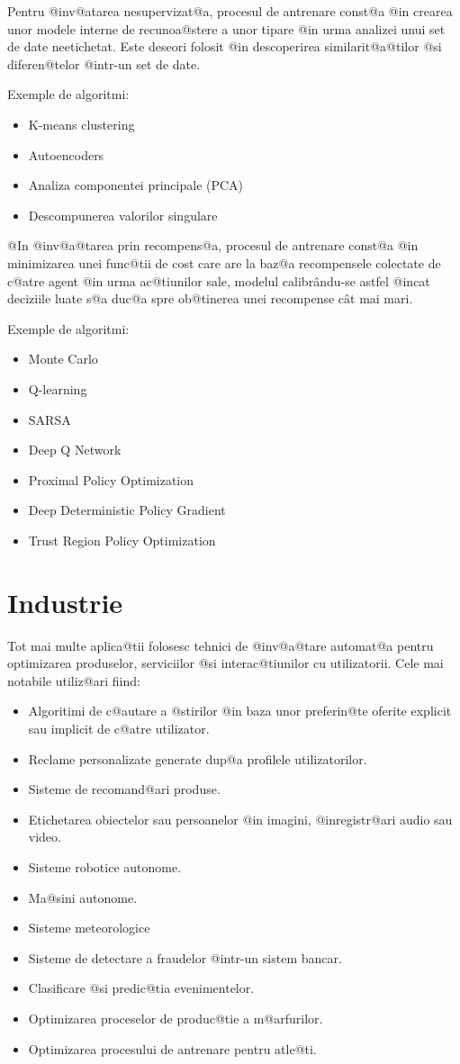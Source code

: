 Pentru @inv@atarea nesupervizat@a, procesul de antrenare const@a @in crearea unor modele interne de recunoa@stere a unor tipare @in urma analizei unui set de date neetichetat. Este deseori folosit @in descoperirea similarit@a@tilor @si diferen@telor @intr-un set de date.

Exemple de algoritmi:
\begin{itemize}
	\item K-means clustering
	\item Autoencoders
	\item Analiza componentei principale (PCA)
	\item Descompunerea valorilor singulare
\end{itemize}

@In @inv@a@tarea prin recompens@a, procesul de antrenare const@a @in minimizarea unei func@tii de cost care are la baz@a recompensele colectate de c@atre agent @in urma ac@tiunilor sale, modelul calibr\^ andu-se astfel @incat deciziile luate s@a duc@a spre ob@tinerea unei recompense c\^ at mai mari.

Exemple de algoritmi:
\begin{itemize}
	\item Monte Carlo
	\item Q-learning
	\item SARSA
	\item Deep Q Network
	\item Proximal Policy Optimization
	\item Deep Deterministic Policy Gradient
	\item Trust Region Policy Optimization
\end{itemize}

\section{Industrie}

	Tot mai multe aplica@tii folosesc tehnici de @inv@a@tare automat@a pentru optimizarea produselor, serviciilor @si interac@tiunilor cu utilizatorii. Cele mai notabile utiliz@ari fiind:
\begin{itemize}
	\item Algoritimi de c@autare a @stirilor @in baza unor preferin@te oferite explicit sau implicit de c@atre utilizator.
	\item Reclame personalizate generate dup@a profilele utilizatorilor.
	\item Sisteme de recomand@ari produse.
	\item Etichetarea obiectelor sau persoanelor @in imagini, @inregistr@ari audio sau video.
	\item Sisteme robotice autonome.
	\item Ma@sini autonome.
	\item Sisteme meteorologice
	\item Sisteme de detectare a fraudelor @intr-un sistem bancar.
	\item Clasificare @si predic@tia evenimentelor. 
	\item Optimizarea proceselor de produc@tie a m@arfurilor.
	\item Optimizarea procesului de antrenare pentru atle@ti.
\end{itemize}

